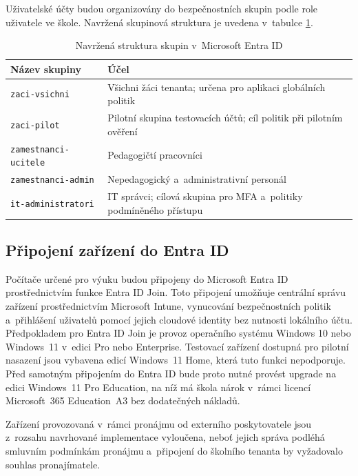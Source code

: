 \documentclass[male,czech,api_bc]{kitheses}
\begin{document}
Uživatelské účty budou organizovány do bezpečnostních skupin podle role 
uživatele ve škole. Navržená skupinová struktura je uvedena v~tabulce 
\ref{tab:skupiny}.

\begin{table}[h]
\centering
\caption{Navržená struktura skupin v~Microsoft Entra ID}
\label{tab:skupiny}
\begin{tabular}{|p{4.5cm}|p{8.5cm}|}
\hline
\textbf{Název skupiny} & \textbf{Účel} \\
\hline
\texttt{zaci-vsichni} & Všichni žáci tenanta; určena pro aplikaci globálních politik \\
\hline
\texttt{zaci-pilot} & Pilotní skupina testovacích účtů; cíl politik při pilotním ověření \\
\hline
\texttt{zamestnanci-ucitele} & Pedagogičtí pracovníci \\
\hline
\texttt{zamestnanci-admin} & Nepedagogický a~administrativní personál \\
\hline
\texttt{it-administratori} & IT správci; cílová skupina pro MFA a~politiky podmíněného přístupu \\
\hline
\end{tabular}
\end{table}

\subsection{Připojení zařízení do Entra ID}

Počítače určené pro výuku budou připojeny do Microsoft Entra ID prostřednictvím 
funkce Entra ID Join. Toto připojení umožňuje centrální správu zařízení 
prostřednictvím Microsoft Intune, vynucování bezpečnostních politik a~přihlášení 
uživatelů pomocí jejich cloudové identity bez nutnosti lokálního účtu. 
Předpokladem pro Entra ID Join je provoz operačního systému Windows 10 nebo 
Windows~11 v~edici Pro nebo Enterprise. Testovací zařízení dostupná pro pilotní 
nasazení jsou vybavena edicí Windows~11 Home, která tuto funkci nepodporuje. 
Před samotným připojením do Entra ID bude proto nutné provést upgrade na edici 
Windows~11 Pro Education, na níž má škola nárok v~rámci licencí 
Microsoft~365 Education~A3 bez dodatečných nákladů.

Zařízení provozovaná v~rámci pronájmu od externího poskytovatele jsou z~rozsahu 
navrhované implementace vyloučena, neboť jejich správa podléhá smluvním 
podmínkám pronájmu a~připojení do školního tenanta by vyžadovalo souhlas 
pronajímatele.
\end{document}
